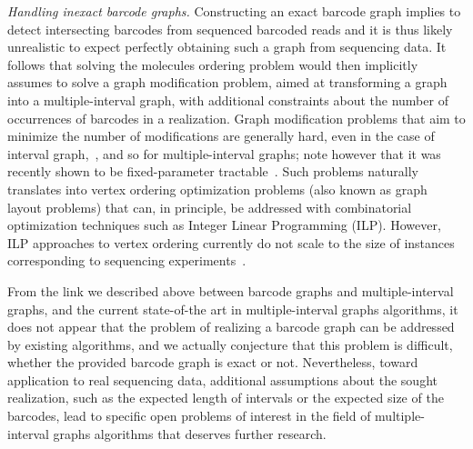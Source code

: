 \smallskip\noindent\textit{Handling inexact barcode graphs.}
Constructing an exact barcode graph implies to detect intersecting barcodes from sequenced barcoded reads and it is thus likely unrealistic to expect perfectly obtaining such a graph from sequencing data. 
It follows that solving the molecules ordering problem would then implicitly assumes to solve a graph modification problem, aimed at transforming  a graph into a multiple-interval graph, with additional constraints about the number of occurrences of barcodes in a realization.
Graph modification problems that aim to minimize the number of modifications are generally hard, even in the case of interval graph,~\cite{CrespelleDFG_2020}, and so for multiple-interval graphs; note however that it was recently shown to be fixed-parameter tractable~\cite{VillangerHPT_2009,BliznetsFPP_2018,CrespelleDFG_2020}.
Such problems naturally translates into vertex ordering optimization problems (also known as graph layout problems) that can, in principle, be addressed with combinatorial optimization techniques such as Integer Linear Programming (ILP).
However, ILP approaches to vertex ordering currently do not scale to the size of instances corresponding to sequencing experiments~\cite{Coudert_2016}.

\smallskip
From the link we described above between barcode graphs and multiple-interval graphs, and the current state-of-the art in multiple-interval graphs algorithms, it does not appear that the problem of realizing a barcode graph can be addressed by existing algorithms, and we actually conjecture that this problem is difficult, whether the provided barcode graph is exact or not. 
Nevertheless, toward application to real sequencing data, additional assumptions about the sought realization, such as the expected length of intervals or the expected size of the barcodes, lead to specific open problems of interest in the field of multiple-interval graphs algorithms that deserves further research.



